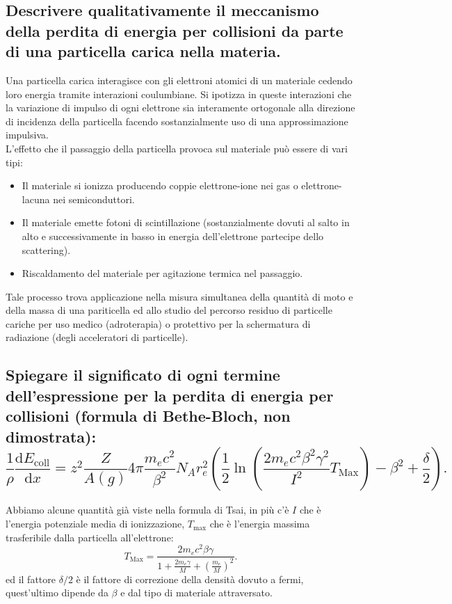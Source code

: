 \subsection[\hspace{1mm} ]{Descrivere qualitativamente il meccanismo della perdita di energia per collisioni da parte di una particella carica nella materia.
}\label{sec:4.a.21}
Una particella carica interagisce con gli elettroni atomici di un materiale cedendo loro energia tramite interazioni coulumbiane. Si ipotizza in queste interazioni che la variazione di impulso di ogni elettrone sia interamente ortogonale alla direzione di incidenza della particella facendo sostanzialmente uso di una approssimazione impulsiva. \\
L'effetto che il passaggio della particella provoca sul materiale può essere di vari tipi:
\begin{itemize}
	\item Il materiale si ionizza producendo coppie elettrone-ione nei gas o elettrone-lacuna nei semiconduttori.
	\item Il materiale emette fotoni di scintillazione (sostanzialmente dovuti al salto in alto e successivamente in basso in energia dell'elettrone partecipe dello scattering).
	\item Riscaldamento del materiale per agitazione termica nel passaggio.
\end{itemize}
Tale processo trova applicazione nella misura simultanea della quantità di moto e della massa di una pariticella ed allo studio del percorso residuo di particelle cariche per uso medico (adroterapia) o protettivo per la schermatura di radiazione (degli acceleratori di particelle).

\subsection[\hspace{1mm} ]{Spiegare il significato di ogni termine dell’espressione per la perdita di energia per collisioni (formula di Bethe-Bloch, non dimostrata):
	\[
		\frac{1}{\rho}\frac{\mbox{d} E_{\text{coll}}}{\mbox{d} x} = 
		z^2 \frac{Z}{A\left( g \right) }4\pi \frac{m_e c^2}{\beta^2} N_A r^2_e 
		\left( \frac{1}{2}\ln\left( \frac{2m_e c^2 \beta^2 \gamma^2}{I^2}T_{\text{Max}} \right) - \beta^2 + \frac{\delta}{2} \right) 
	.\] 
}\label{sec:4.a.22}
Abbiamo alcune quantità già viste nella formula di Tsai, in più c'è $I$ che è l'energia potenziale media di ionizzazione, $T_{\text{max}}$ che è l'energia massima trasferibile dalla particella all'elettrone:
\[
	T_{\text{Max}}= \frac{2m_e c^2 \beta\gamma}{1+ \frac{2m_e \gamma}{M}+\left( \frac{m_e}{M} \right) ^2}
.\] 
ed il fattore $\delta /2$ è il fattore di correzione della densità dovuto a fermi, quest'ultimo dipende da $\beta$ e dal tipo di materiale attraversato.

